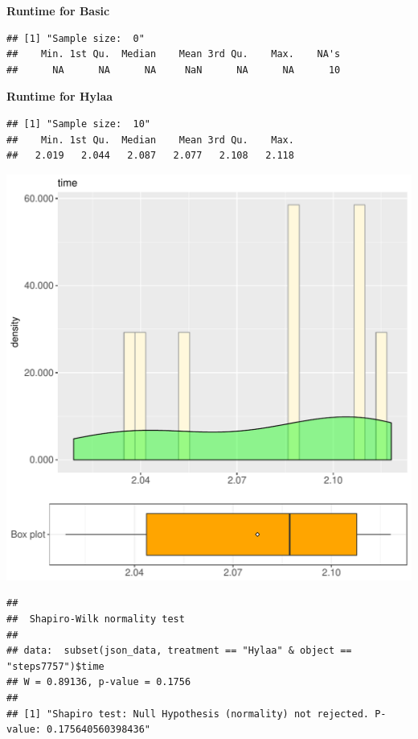 \documentclass{article}\usepackage[]{graphicx}\usepackage[]{color}
\makeatletter
\def\maxwidth{ %
  \ifdim\Gin@nat@width>\linewidth
    \linewidth
  \else
    \Gin@nat@width
  \fi
}
\newenvironment{kframe}{%
 \def\at@end@of@kframe{}%
 \ifinner\ifhmode%
  \def\at@end@of@kframe{\end{minipage}}%
  \begin{minipage}{\columnwidth}%
 \fi\fi%
 \def\FrameCommand##1{\hskip\@totalleftmargin \hskip-\fboxsep
 \colorbox{shadecolor}{##1}\hskip-\fboxsep
     \hskip-\linewidth \hskip-\@totalleftmargin \hskip\columnwidth}%
 \MakeFramed {\advance\hsize-\width
   \@totalleftmargin\z@ \linewidth\hsize
   \@setminipage}}%
 {\par\unskip\endMakeFramed%
 \at@end@of@kframe}
\newenvironment{knitrout}{}{} %
\makeatother
\begin{document}
 \textbf{Runtime for Basic}
\begin{knitrout}
\color{fgcolor}\begin{kframe}
\begin{verbatim}
## [1] "Sample size:  0"
##    Min. 1st Qu.  Median    Mean 3rd Qu.    Max.    NA's 
##      NA      NA      NA     NaN      NA      NA      10
\end{verbatim}
\end{kframe}
\end{knitrout}
 \textbf{Runtime for Hylaa}
\begin{knitrout}
\color{fgcolor}\begin{kframe}
\begin{verbatim}
## [1] "Sample size:  10"
##    Min. 1st Qu.  Median    Mean 3rd Qu.    Max. 
##   2.019   2.044   2.087   2.077   2.108   2.118
\end{verbatim}
\end{kframe}
\includegraphics[width=\maxwidth]{figure/RH3_Hylaa_steps7757-1} 
\begin{kframe}\begin{verbatim}
## 
## 	Shapiro-Wilk normality test
## 
## data:  subset(json_data, treatment == "Hylaa" & object == "steps7757")$time
## W = 0.89136, p-value = 0.1756
## 
## [1] "Shapiro test: Null Hypothesis (normality) not rejected. P-value: 0.175640560398436"
\end{verbatim}
\end{kframe}
\end{knitrout}
  
\end{document}
